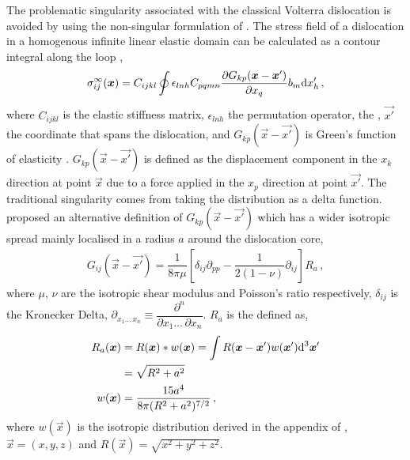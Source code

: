 The problematic singularity associated with the classical Volterra dislocation is avoided by using the non-singular formulation of \citet{a_non-singular_continuum_theory_of_dislocations}. The stress field of a dislocation in a homogenous infinite linear elastic domain can be calculated as a contour integral along the loop \cite{mura_t},
\begin{align}\label{eq:field_stress}
	\sigma_{ij}^{\infty}(\vec{x}) = C_{ijkl} \oint \epsilon_{lnh} C_{pqmn} \dfrac{\partial G_{kp}(\vec{x} - \vec{x'})}{\partial x_{q}} b_{m} \rvar{d}x'_{h}\,,
\end{align}
where $ C_{ijkl} $ is the elastic stiffness matrix, $ \epsilon_{lnh} $ the permutation operator,  the , $ \vec{x'} $ the coordinate that spans the dislocation, and $ G_{kp}(\vec{x} - \vec{x'}) $ is Green's function of elasticity \cite{mura_t}. $ G_{kp}(\vec{x} - \vec{x'}) $ is defined as the displacement component in the $ x_{k} $ direction at point $ \vec{x} $ due to a force applied in the $ x_{p} $ direction at point $ \vec{x'} $. The traditional singularity comes from taking the  distribution as a delta function. \citet{a_non-singular_continuum_theory_of_dislocations} proposed an alternative definition of $ G_{kp}(\vec{x} - \vec{x'}) $ which has a wider isotropic spread mainly localised in a radius $ a $ around the dislocation core,
\begin{align}\label{eq:elastic_green_func}
	G_{ij}(\vec{x} - \vec{x'}) = \dfrac{1}{8\pi \mu}\left[ \delta_{ij} \partial_{pp} - \dfrac{1}{2(1-\nu)} \partial_{ij} \right] R_{a}\,,
\end{align}
where $ \mu $, $ \nu $ are the isotropic shear modulus and Poisson's ratio respectively, $ \delta_{ij} $ is the Kronecker Delta, $ \partial_{x_{1} \ldots\, x_{n}} \equiv \dfrac{\partial^{n}}{\partial x_{1} \ldots\, \partial x_{n}}$. $ R_{a} $ is the defined as,
\begin{subequations}
	\begin{align}\label{eq:ra}
		R_{a}(\vec{x}) & = R(\vec{x}) * w(\vec{x}) = \int R(\vec{x} - \vec{x'}) w(\vec{x'}) \rvar{d}^{3}\vec{x'}\nn
		               & = \sqrt{R^{2} + a^{2}}                                                                     \\
		w(\vec{x})     & = \dfrac{15 a^{4}}{8\pi (R^{2} + a^{2})^{7/2}}\,,
	\end{align}
\end{subequations}
where $ w(\vec{x}) $ is the isotropic  distribution derived in the appendix of \cite{a_non-singular_continuum_theory_of_dislocations}, $ \vec{x} = (x, y, z) $ and $ R(\vec{x}) = \sqrt{x^{2} + y^{2} + z^{2}} $.

